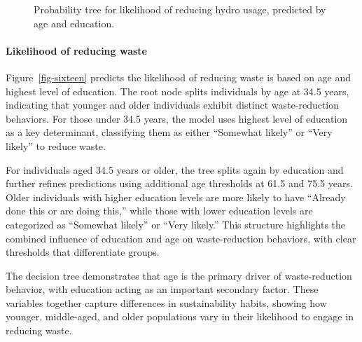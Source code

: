\documentclass[
  letterpaper,
  DIV=11,
  numbers=noendperiod]{scrartcl}
\let\oldparagraph\paragraph
\renewcommand{\paragraph}[1]{\oldparagraph{#1}\mbox{}}
\begin{document}
\begin{figure}


\caption{\label{fig-fifteen}Probability tree for likelihood of reducing
hydro usage, predicted by age and education.}

\end{figure}%

\paragraph{Likelihood of reducing
waste}\label{likelihood-of-reducing-waste}

Figure~\ref{fig-sixteen} predicts the likelihood of reducing waste is
based on age and highest level of education. The root node splits
individuals by age at 34.5 years, indicating that younger and older
individuals exhibit distinct waste-reduction behaviors. For those under
34.5 years, the model uses highest level of education as a key
determinant, classifying them as either ``Somewhat likely'' or ``Very
likely'' to reduce waste.

For individuals aged 34.5 years or older, the tree splits again by
education and further refines predictions using additional age
thresholds at 61.5 and 75.5 years. Older individuals with higher
education levels are more likely to have ``Already done this or are
doing this,'' while those with lower education levels are categorized as
``Somewhat likely'' or ``Very likely.'' This structure highlights the
combined influence of education and age on waste-reduction behaviors,
with clear thresholds that differentiate groups.

The decision tree demonstrates that age is the primary driver of
waste-reduction behavior, with education acting as an important
secondary factor. These variables together capture differences in
sustainability habits, showing how younger, middle-aged, and older
populations vary in their likelihood to engage in reducing waste.
\end{document}
